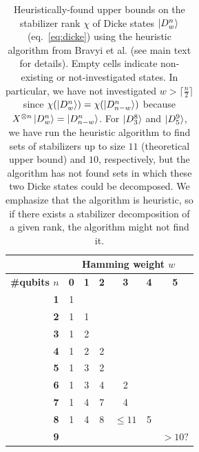 \begin{table}[b!]
    \centering
    \setlength{\tabcolsep}{12pt}
    \begin{tabular}{|r|cccccc|}
        \hline
        & \multicolumn{6}{c|}{\textbf{Hamming weight $w$}}\\\hline
        \textbf{\#qubits $n$} & \textbf{0} & \textbf{1} & \textbf{2} & \textbf{3} & \textbf{4} & \textbf{5} \\\hline
        \textbf{1} & 1 &   &   &   &   &\\
        \textbf{2} & 1 & 1 &   &   &   &\\
        \textbf{3} & 1 & 2 &   &   &   &\\
        \textbf{4} & 1 & 2 & 2 &   &   &\\
        \textbf{5} & 1 & 3 & 2 &   &   &\\
        \textbf{6} & 1 & 3 & 4 & 2 &   &\\
        \textbf{7} & 1 & 4 & 7 & 4 &   &\\
        \textbf{8} & 1 & 4 & 8 & $\leq 11$  & 5 &\\
        \textbf{9} &   &   &   &   & & $>10?$  \\\hline
    \end{tabular}
    \caption{
        \label{table:stabilizer-rank-search}
        Heuristically-found upper bounds on the stabilizer rank $\chi$ of Dicke states $\ket{D^{n}_{w}}$ (eq.~\eqref{eq:dicke}) using the heuristic algorithm from Bravyi et al. \cite{bravyi2016trading} (see main text for details).
        Empty cells indicate non-existing or not-investigated states.
        In particular, we have not investigated $w> \lceil \frac{n}{2}\rceil$ since $\chi(\ket{D^{n}_{w}}) = \chi(\ket{D^{n}_{n-w}})$ because $X^{\otimes n} \ket{D^{n}_{w}} = \ket{D^{n}_{n-w}}$.
        For $\ket{D^{8}_{3}}$ and $\ket{D^{9}_{5}}$, we have run the heuristic algorithm to find sets of stabilizers up to size $11$ (theoretical upper bound) and $10$, respectively, but the algorithm has not found sets in which these two Dicke states could be decomposed.
        We emphasize that the algorithm is heuristic, so if there exists a stabilizer decomposition of a given rank, the algorithm might not find it.
    }
\end{table}

